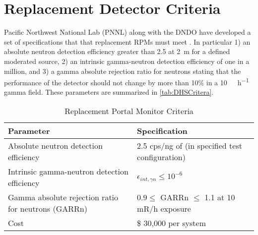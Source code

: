 \section{Replacement Detector Criteria}
\label{sec:ReplacmentCriteria}
Pacific Northwest National Lab (PNNL) along with the DNDO have developed a set of specifications that that replacement RPMs must meet \cite{kouzes_neutron_2010, kouzes_neutron_1999}. 
In particular 1) an absolute neutron detection efficiency greater than \SI{2.5}{\cps} at \SI{2}{\meter} for a defined moderated  source, 2) an intrinsic gamma-neutron detection efficiency of one in a million, and 3) a gamma absolute rejection ratio for neutrons stating that the performance of the detector should not change by more than 10\% in a \SI{10}{\milli\roetgen\per\hour} gamma field.
These parameters are summarized in \autoref{tab:DHSCritera}.
\begin{table}
  \centering
	\caption{Replacement Portal Monitor Criteria}
	\begin{tabular}{m{8cm} m{6cm} }
	Parameter & Specification \\
	\hline
	\hline
	Absolute neutron detection efficiency & 2.5 cps/ng of \iso[252]{Cf} (in specified test configuration) \\
	Intrinsic gamma-neutron detection efficiency & $ \epsilon_{int,\gamma n}\leq 10^{-6}$ \\
	Gamma absolute rejection ratio for neutrons (GARRn) & $ 0.9 \leq \text{ GARRn }\leq$ 1.1 at 10 mR/h exposure \\
	Cost &  \$ 30,000 per system \\
	\end{tabular}
	\label{tab:DHSCritera}
\end{table}

